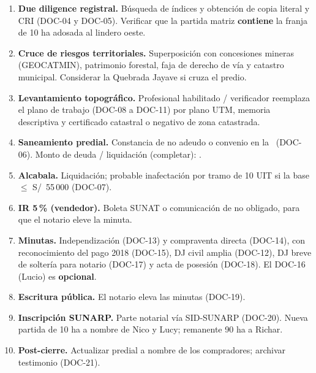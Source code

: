 \documentclass[12pt,a4paper]{article}
\begin{document}
\begin{enumerate}[leftmargin=1.15cm, itemsep=0.28em]
\item \textbf{Due diligence registral.} Búsqueda de índices y obtención de copia literal y CRI (DOC-04 y DOC-05). Verificar que la partida matriz \textbf{contiene} la franja de 10 ha adosada al lindero oeste.
\item \textbf{Cruce de riesgos territoriales.} Superposición con concesiones mineras (GEOCATMIN), patrimonio forestal, faja de derecho de vía y catastro municipal. Considerar la Quebrada Jayave si cruza el predio.
\item \textbf{Levantamiento topográfico.} Profesional habilitado / verificador reemplaza el plano de trabajo (DOC-08 a DOC-11) por plano UTM, memoria descriptiva y certificado catastral o negativo de zona catastrada.
\item \textbf{Saneamiento predial.} Constancia de no adeudo o convenio en la \Municipalidad\ (DOC-06). Monto de deuda / liquidación (completar): \DeudaPredialReferencia.
\item \textbf{Alcabala.} Liquidación; probable inafectación por tramo de 10 UIT si la base $\leq$ S/\ 55\,000 (DOC-07).
\item \textbf{IR 5\,\% (vendedor).} Boleta SUNAT o comunicación de no obligado, para que el notario eleve la minuta.
\item \textbf{Minutas.} Independización (DOC-13) y compraventa directa (DOC-14), con reconocimiento del pago 2018 (DOC-15), DJ civil amplia (DOC-12), DJ breve de soltería para notario (DOC-17) y acta de posesión (DOC-18). El DOC-16 (Lucio) es \textbf{opcional}.
\item \textbf{Escritura pública.} El notario eleva las minutas (DOC-19).
\item \textbf{Inscripción SUNARP.} Parte notarial vía SID-SUNARP (DOC-20). Nueva partida de 10 ha a nombre de Nico y Lucy; remanente 90 ha a Richar.
\item \textbf{Post-cierre.} Actualizar predial a nombre de los compradores; archivar testimonio (DOC-21).
\end{enumerate}
\end{document}

